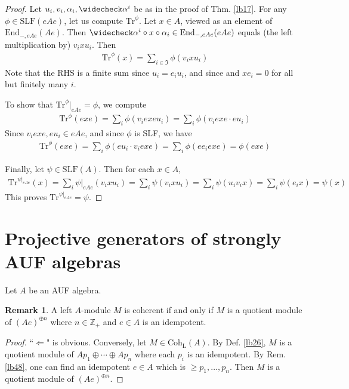 \documentclass[11pt,b5paper,notitlepage]{article}
\theoremstyle{definition}
\newtheorem{rem}[df]{Remark}
\theoremstyle{plain}
\newcommand{\fk}{\mathfrak}
\newcommand{\wch}{\widecheck}
\newcommand{\Tr}{\mathrm{Tr}}
\newcommand{\End}{\mathrm{End}} %
\newcommand{\Zbb}{\mathbb Z}
\newcommand{\Coh}{\mathrm{Coh}_{\mathrm L}}
\newcommand{\SLF}{\mathrm{SLF}}
\numberwithin{equation}{section}
\begin{document}
\begin{proof}
Let $u_i,v_i,\alpha_i,\wch\alpha^i$ be as in the proof of Thm. \ref{lb17}. For any $\phi\in\SLF(eAe)$, let us compute $\Tr^\phi$. Let $x\in A$, viewed as an element of $\End_{-,eAe}(Ae)$. Then $\wch\alpha^i\circ x\circ\alpha_i\in\End_{-,eAe}(eAe)$ equals (the left multiplication by) $v_ixu_i$. Then
\begin{align}
\Tr^\phi(x)=\sum_{i\in\fk I}\phi(v_ixu_i)
\end{align}
Note that the RHS is a finite sum since $u_i=e_iu_i$, and since and $xe_i=0$ for all but finitely many $i$. 

To show that $\Tr^\phi|_{eAe}=\phi$, we compute
\begin{align*}
\Tr^\phi(exe)=\sum_i\phi(v_iexeu_i)=\sum_i\phi(v_iexe\cdot eu_i)
\end{align*}
Since $v_iexe,eu_i\in eAe$, and since $\phi$ is SLF, we have
\begin{align*}
\Tr^\phi(exe)=\sum_i\phi(eu_i\cdot v_iexe)=\sum_i\phi(ee_iexe)=\phi(exe)
\end{align*}

Finally, let $\psi\in\SLF(A)$. Then for each $x\in A$,
\begin{align*}
\Tr^{\psi|_{eAe}}(x)=\sum_i\psi|_{eAe}(v_ixu_i)=\sum_i\psi(v_ixu_i)=\sum_i\psi(u_iv_ix)=\sum_i\psi(e_ix)=\psi(x)
\end{align*}
This proves $\Tr^{\psi|_{eAe}}=\psi$.
\end{proof}






\section{Projective generators of strongly AUF algebras}

Let $A$ be an AUF algebra.

\begin{rem}\label{lb35}
A left $A$-module $M$ is coherent if and only if $M$ is a quotient module of $(Ae)^{\oplus n}$ where $n\in\Zbb_+$ and $e\in A$ is an idempotent.
\end{rem}

\begin{proof}
``$\Leftarrow$" is obvious. Conversely, let $M\in\Coh(A)$. By Def. \ref{lb26}, $M$ is a quotient module of $Ap_1\oplus\cdots\oplus Ap_n$ where each $p_i$ is an idempotent. By Rem. \ref{lb48}, one can find an idempotent $e\in A$ which is $\geq p_1,\dots,p_n$. Then $M$ is a quotient module of $(Ae)^{\oplus n}$.
\end{proof}
\end{document}
